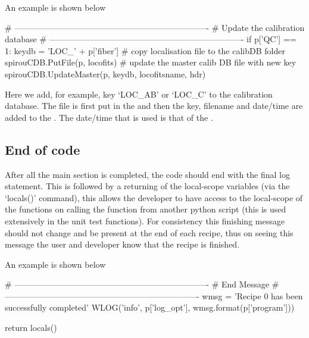 \vspace{0.5cm}
\begin{minipage}{\textwidth}
\noindent An example is shown below
\begin{pythonbox}
# ----------------------------------------------------------------------
# Update the calibration database
# ----------------------------------------------------------------------
if p['QC'] == 1:
    keydb = 'LOC_' + p['fiber']
    # copy localisation file to the calibDB folder
    spirouCDB.PutFile(p, locofits)
    # update the master calib DB file with new key
    spirouCDB.UpdateMaster(p, keydb, locofitsname, hdr)
\end{pythonbox}
\begin{note}
Here we add, for example, key `LOC\_AB' or `LOC\_C' to the calibration database. The file is first put in the  and then the key, filename and date/time are added to the \masterCALIBDBfile. The date/time that is used is that of the .
\end{note}
\end{minipage}

\subsection{End of code}
\label{ch:the_recipes:gen_layout:end}

After all the main section is completed, the code should end with the final log statement. This is followed by a returning of the local-scope variables (via the `locals()' command), this allows the developer to have access to the local-scope of the functions on calling the function from another python script (this is used extensively in the unit test functions). For consistency this finishing message should not change and be present at the end of each recipe, thus on seeing this message the user and developer know that the recipe is finished.

\vspace{0.5cm}
\begin{minipage}{\textwidth}
\noindent An example is shown below
\begin{pythonbox}
# ----------------------------------------------------------------------
# End Message
# ----------------------------------------------------------------------
wmsg = 'Recipe {0} has been successfully completed'
WLOG('info', p['log_opt'], wmsg.format(p['program']))

return locals()
\end{pythonbox}
\end{minipage}

\clearpage
\newpage
\fi